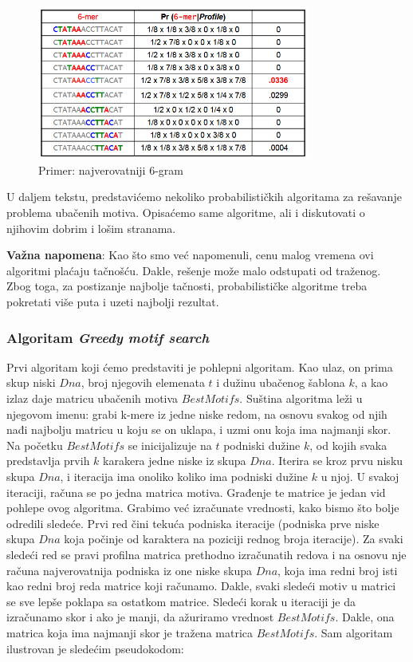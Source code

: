 \begin{figure}[h]
\caption{Primer: najverovatniji 6-gram}
\centering
\includegraphics[width=0.8\textwidth]{poglavlja/2/slike/63-2.PNG}
\end{figure}

U daljem tekstu, predstavićemo nekoliko probabilističkih algoritama za rešavanje problema ubačenih motiva. Opisaćemo same algoritme, ali i diskutovati o njihovim dobrim i lošim stranama.

\noindent \textbf{Važna napomena}: Kao što smo već napomenuli, cenu malog vremena ovi algoritmi plaćaju tačnošću. Dakle, rešenje može malo odstupati od traženog. Zbog toga, za postizanje najbolje tačnosti, probabilističke algoritme treba pokretati više puta i uzeti najbolji rezultat.

\subsubsection{Algoritam \textit{Greedy motif search}}
Prvi algoritam koji ćemo predstaviti je pohlepni algoritam. Kao ulaz, on prima skup niski $Dna$, broj njegovih elemenata $t$ i dužinu ubačenog šablona $k$, a kao izlaz daje matricu ubačenih motiva $BestMotifs$. Suština algoritma leži u njegovom imenu: grabi k-mere iz jedne niske redom, na osnovu svakog od njih nađi najbolju matricu u koju se on uklapa, i uzmi onu koja ima najmanji skor.
Na početku $BestMotifs$ se inicijalizuje na $t$ podniski dužine $k$, od kojih svaka predstavlja prvih $k$ karakera jedne niske iz skupa $Dna$. Iterira se kroz prvu nisku skupa $Dna$, i iteracija ima onoliko koliko ima podniski dužine $k$ u njoj. U svakoj iteraciji, računa se po jedna matrica motiva. Građenje te matrice je jedan vid pohlepe ovog algoritma. Grabimo već izračunate vrednosti, kako bismo što bolje odredili sledeće. Prvi red čini tekuća podniska iteracije (podniska prve niske skupa $Dna$ koja počinje od karaktera na poziciji rednog broja iteracije). Za svaki sledeći red se pravi profilna matrica prethodno izračunatih redova i na osnovu nje računa najverovatnija podniska iz one niske skupa $Dna$, koja ima redni broj isti kao redni broj reda matrice koji računamo. Dakle, svaki sledeći motiv u matrici se sve lepše poklapa sa ostatkom matrice. Sledeći korak u iteraciji je da izračunamo skor i ako je manji, da ažuriramo vrednost $BestMotifs$. Dakle, ona matrica koja ima najmanji skor je tražena matrica $BestMotifs$. Sam algoritam ilustrovan je sledećim pseudokodom:


